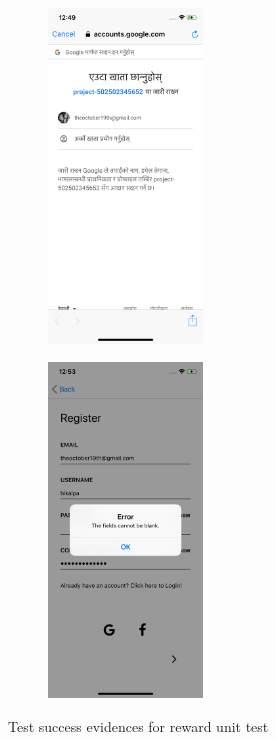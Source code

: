 \documentclass[12pt, a4paper, oneside]{article}
\begin{document}
\begin{figure}[H]
\begin{subfigure}{.5\textwidth}
    \centering
    \includegraphics[width=0.45\textwidth]{test-evidences/auth/e.png}
    \caption{}
\end{subfigure}%
\begin{subfigure}{.5\textwidth}
    \centering
    \includegraphics[width=0.45\textwidth]{test-evidences/auth/f.png}
    \caption{}
\end{subfigure}


\caption{Test success evidences for reward unit test}
\label{fig:test-evidence-reward}
\end{figure}
\end{document}
